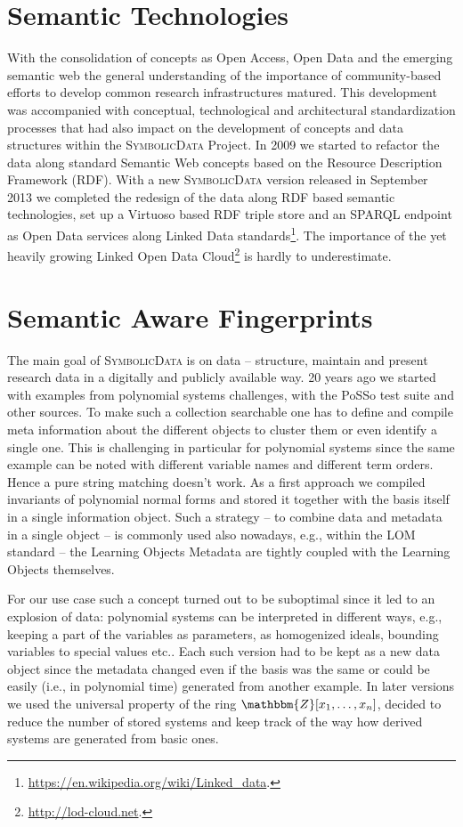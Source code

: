 \documentclass[a4paper,11pt]{article}
\def\SD{\textsc{SymbolicData}}
\begin{document}
\section{Semantic Technologies}

With the consolidation of concepts as Open Access, Open Data and the emerging
semantic web the general understanding of the importance of community-based
efforts to develop common research infrastructures matured.  This development
was accompanied with conceptual, technological and architectural
standardization processes that had also impact on the development of concepts
and data structures within the {\SD} Project.  In 2009 we started to refactor
the data along standard Semantic Web concepts based on the Resource Description
Framework (RDF).  With a new {\SD} version released in September 2013 we
completed the redesign of the data along RDF based semantic technologies, set
up a Virtuoso based RDF triple store and an SPARQL endpoint as Open Data
services along Linked Data
standards\footnote{\url{https://en.wikipedia.org/wiki/Linked_data}.}. The
importance of the yet heavily growing Linked Open Data
Cloud\footnote{\url{http://lod-cloud.net}.} is hardly to underestimate.

\section{Semantic Aware Fingerprints}

The main goal of {\SD} is on data -- structure, maintain and present research
data in a digitally and publicly available way. 20 years ago we started with
examples from polynomial systems challenges, with the PoSSo test suite and
other sources. To make such a collection searchable one has to define and
compile meta information about the different objects to cluster them or even
identify a single one. This is challenging in particular for polynomial systems
since the same example can be noted with different variable names and different
term orders.  Hence a pure string matching doesn't work.  As a first approach
we compiled invariants of polynomial normal forms and stored it together with
the basis itself in a single information object.  Such a strategy -- to combine
data and metadata in a single object -- is commonly used also nowadays, e.g.,
within the LOM standard -- the Learning Objects Metadata are tightly coupled
with the Learning Objects themselves.

For our use case such a concept turned out to be suboptimal since it led to an
explosion of data: polynomial systems can be interpreted in different ways,
e.g., keeping a part of the variables as parameters, as homogenized ideals,
bounding variables to special values etc.. Each such version had to be kept as
a new data object since the metadata changed even if the basis was the same or
could be easily (i.e., in polynomial time) generated from another example. In
later versions we used the universal property of the ring
$\mathbbm{Z}[x_1,\dots,x_n]$, decided to reduce the number of stored systems
and keep track of the way how derived systems are generated from basic ones.
\end{document}
